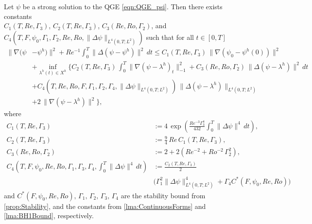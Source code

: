 \begin{thm} \label{thm:SemiConvergence}
  Let $\psi$ be a strong solution to the QGE \eqref{eqn:QGE_psi}. Then there
  exists constants \\ $C_1(T,Re,\Gamma_3)$, $C_2(T,Re,\Gamma_3)$,
  $C_3(Re,Ro,\Gamma_2)$, and $C_4(T, F, \psi_0, \Gamma_1, \Gamma_2, Re,
  Ro,\|\Delta \psi\|_{L^4(0,T;L^2)})$ such that for all $t\in [0,T]$
  \begin{equation}
    \begin{split}
      \|\nabla (\psi &- \psi^h) \|^2 + Re^{-1}
        \int_{0}^{T}\! \|\Delta (\psi - \psi^h)\|^2 \, dt
        \le C_1(T,Re,\Gamma_3)\,\|\nabla(\psi_0 - \psi^h(0))\|^2 \\
      & + \inf_{\lambda^h(t) \in X^h} \biggl\{
        C_2(T,Re,\Gamma_3)\,\int_0^T\! \|\nabla(\psi - \lambda^h)_t\|^2_{-1}
        + C_3(Re,Ro,\Gamma_2)\, \|\Delta(\psi - \lambda^h)\|^2\, dt \\
      & + C_4(T,Re,Ro,F,\Gamma_1,\Gamma_2,\Gamma_4, \|\Delta
        \psi\|_{L^4(0,T;L^2)})\,\|\Delta(\psi - \lambda^h)\|_{L^4(0,T;L^2)} \\
      & + 2\,\|\nabla (\psi - \lambda^h)\|^2\biggr\},
    \end{split}
    \label{eqn:SemiConvergence}
  \end{equation}
  where
  \begin{align}
    C_1(T,Re,\Gamma_3) &:= 4\, \exp\left(\frac{Re^{-3} \Gamma_3^4}{432}
      \int_{0}^{T}\! \|\Delta \psi\|^4\, dt\right), \label{eqn:C1}\\
    C_2(T,Re,\Gamma_3) &:= \frac{9}{4}\, Re\, C_1(T,Re,\Gamma_3), \label{eqn:C2}\\
    C_3(Re,Ro,\Gamma_2) &:= 2 + 2\left(Re^{-2} + Ro^{-2}\, \Gamma_2^2\right), \label{eqn:C3} \\
    C_4(T,F,\psi_0,Re,Ro,\Gamma_1,\Gamma_3,\Gamma_4,\int_{0}^{T}\! \|\Delta
    \psi\|^4\, dt) &:= \frac{C_2(T,Re,\Gamma_3)}{2} \\
      & \biggl(\Gamma_1^2 \|\Delta \psi\|^4_{L^4(0,T;L^2)} + \Gamma_4
        C^*(F,\psi_0,Re,Ro)\biggr) \label{eqn:C4}
  \end{align}
  and $C^*(F,\psi_0,Re,Ro),\, \Gamma_1,\, \Gamma_2,\, \Gamma_3,\, \Gamma_4$ are
  the stability bound from \autoref{prop:Stability}, and the constants from
  \autoref{lma:ContinuousForms} and \autoref{lma:BH1Bound}, respectively.
\end{thm}
